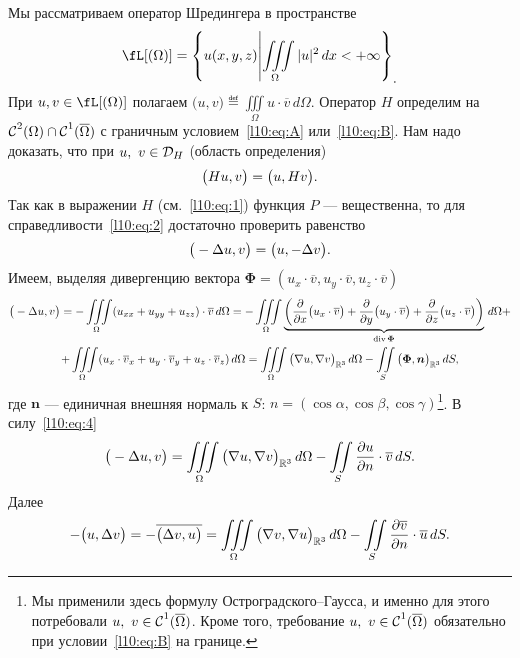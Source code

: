 Мы рассматриваем оператор Шредингера в пространстве 
\begin{equation*}
	\hfill\fL[(\Omega)]=\left\{u(x,y,z)\middle|\iiint\limits_{\Omega}|u|^2\,dx<+\infty\right\}_{\displaystyle.}\hfill
\end{equation*}
При $u,v\in\fL[(\Omega)]$ полагаем $\displaystyle\big(u,v\big)\eqdef\iiint\limits_{\Omega}u\cdot\overline{v}\,d\Omega$. Оператор $H$ определим на $\mathcal{C}{\mathstrut}^{2}_{}(\Omega)\cap\mathcal{C}{\mathstrut}^{1}_{}(\overline{\Omega})$ с граничным условием~\eqref{l10:eq:A} или~\eqref{l10:eq:B}. Нам надо доказать, что при $u,\ v\in\mc{D}_{H}$ (область определения)
\begin{equation}\label{l10:eq:2}
	\hfill\big(Hu,v\big)=\big(u,Hv\big).\hfill
\end{equation}
Так как в выражении $H$ (см.~\eqref{l10:eq:1}) функция $P$ --- вещественна, то для справедливости~\eqref{l10:eq:2} достаточно проверить равенство
\begin{equation}\label{l10:eq:3}
	\hfill\big(-\Delta u,v\big)=\big(u,-\Delta v\big).\hfill
\end{equation}
Имеем, выделяя дивергенцию вектора $\bm{\Phi}=(u_x\cdot\overline{v},u_y\cdot\overline{v},u_z\cdot\overline{v})$
\begin{multline}\label{l10:eq:4}
	\big(-\Delta u,v\big)=-\iiint\limits_{\Omega}(u_{xx}+u_{yy}+u_{zz})\cdot\overline{v}\,d\Omega=-\iiint\limits_{\Omega}\underbrace{\left(\frac{\partial}{\partial x}\big(u_x\cdot\overline{v}\big)+\frac{\partial}{\partial y}\big(u_y\cdot\overline{v}\big)+\frac{\partial}{\partial z}\big(u_z\cdot\overline{v}\big)\right)}_{\operatorname{div}\bm{\Phi}}\,d\Omega+\\
	+\iiint\limits_{\Omega}(u_x\cdot\overline{v}_x+u_y\cdot\overline{v}_y+u_z\cdot\overline{v}_z)\,d\Omega=\iiint\limits_{\Omega}\big(\nabla u,\nabla v\big)_{\mathbb{R}^3}\,d\Omega-\iint\limits_{S}\big(\bm{\Phi},\bm{n}\big)_{\mathbb{R}^3}\,dS,
\end{multline}
где $\bm{n}$ --- единичная внешняя нормаль к $S$: $n=(\cos\alpha,\cos\beta,\cos\gamma)$\footnote{Мы применили здесь формулу Остроградского--Гаусса, и именно для этого потребовали $u,\ v\in\Cfn{1}(\overline{\Omega})$. Кроме того, требование $u,\ v\in\Cfn{1}(\overline{\Omega})$ обязательно при условии~\eqref{l10:eq:B} на границе.}. %
В силу~\eqref{l10:eq:4}
\begin{equation}\label{l10:eq:5}
	\big(-\Delta u,v\big)=\iiint\limits_{\Omega}\big(\nabla u,\nabla v\big)_{\mathbb{R}^3}\,d\Omega-\iint\limits_{S}\frac{\partial u}{\partial n}\cdot\overline{v}\,dS.
\end{equation}
Далее
\begin{equation}\label{l10:eq:6}
	-\big(u,\Delta v\big)=-\overline{\big(\Delta v,u\big)}=\iiint\limits_{\Omega}\big(\nabla v,\nabla u\big)_{\mathbb{R}^3}\,d\Omega-\iint\limits_{S}\frac{\partial\overline{v}}{\partial n}\cdot\overline{u}\,dS.
\end{equation}
